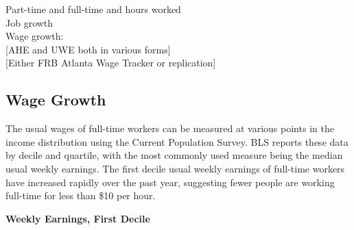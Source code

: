 \documentclass{report}
\begin{document}
{{{{\begin{minipage}{0.76\textwidth}


\normalsize

Part-time and full-time and hours worked \\

Job growth \\

Wage growth: \\

\hspace{4mm} [AHE and UWE both in various forms] \\

\hspace{4mm} [Either FRB Atlanta Wage Tracker or replication]

\end{minipage}


\newpage


\begin{minipage}{0.76\textwidth}

\subsection*{\color{black!70} \seriffont Wage Growth}

\small The usual wages of full-time workers can be measured at various points in the income distribution using the Current Population Survey. BLS reports these data by decile and quartile, with the most commonly used measure being the median usual weekly earnings. The first decile usual weekly earnings of full-time workers have increased rapidly over the past year, suggesting fewer people are working full-time for less than \$10 per hour.\\


\vspace{2mm}

\noindent \normalsize \textbf{Weekly Earnings, First Decile} 


\end{minipage}}}}}
\end{document}

